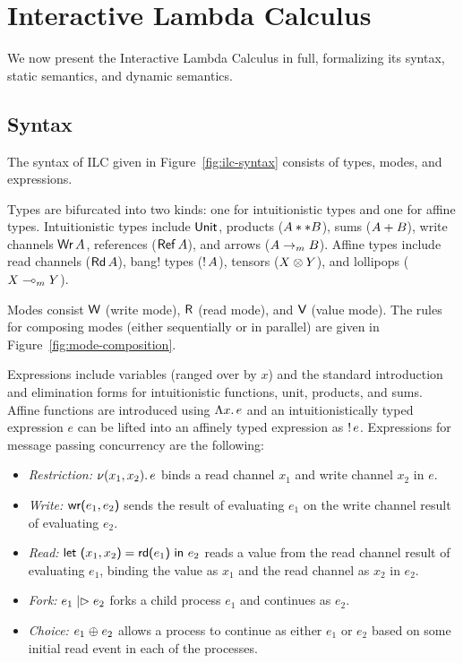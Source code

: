 \section{Interactive Lambda Calculus}
\label{sec:ilc}

We now present the Interactive Lambda Calculus in full, formalizing its syntax,
static semantics, and dynamic semantics.

\subsection{Syntax}
\label{subsec:syntax}



The syntax of ILC given in Figure~\ref{fig:ilc-syntax} consists of types, modes,
and expressions.

Types are bifurcated into two kinds: one for intuitionistic types and one for
affine types. Intuitionistic types include $\text{\textsf{Unit}}$, products
(${A} ** {B}$), sums (${A} + {B}$), write channels $\text{\textsf{Wr}}\,A$, references
($\text{\textsf{Ref}}\,A$), and arrows (${A}\rightarrow_{\footnotesize m}{B}$). Affine types
include read channels ($\text{\textsf{Rd}}\,A$), bang! types (${!}\,{A}$), tensors
(${X}\otimes{Y}$), and lollipops (${X}\multimap_{\footnotesize m}{Y}$).

Modes consist $\textsf{W}$ (write mode), $\textsf{R}$ (read mode), and $\textsf{V}$ (value mode). The
rules for composing modes (either sequentially or in parallel) are given in
Figure~\ref{fig:mode-composition}.

Expressions include variables (ranged over by $x$) and the standard introduction
and elimination forms for intuitionistic functions, unit, products, and
sums.  Affine functions are introduced using
$\Lambda{x}.\,{e}$ and an intuitionistically typed expression $e$ can be lifted into
an affinely typed expression as ${!}\,{e}$. 
Expressions for message passing concurrency are the following:
\begin{itemize}[leftmargin=*]
  \item \emph{Restriction:} $\nu(x_1, x_2).\,e$ binds a read channel $x_1$ and
    write channel $x_2$ in $e$.
  \item \emph{Write:} $\text{\textsf{wr}}\textsf{(}{e_1},{e_2}\textsf{)}$ sends the result of evaluating $e_1$ on
    the write channel result of evaluating $e_2$.
  \item \emph{Read:} $\text{\textsf{let}}\ {\textsf{(}{x_1},{x_2}\textsf{)}} = {\text{\textsf{rd}}\textsf{(}{e_1}\textsf{)}}\ \text{\textsf{in}}\ {{e_2}}$ reads a value from the read
    channel result of evaluating $e_1$, binding the value as $x_1$ and the read
    channel as $x_2$ in $e_2$.
  \item \emph{Fork:} $e_1 \mathrel{|\rhd} e_2$ forks a child process $e_1$ and
    continues as $e_2$.
  \item \emph{Choice:} $e_1 \mathrel{\oplus} e_2$ allows a process to continue as
    either $e_1$ or $e_2$ based on some initial read event in each of the
    processes.
\end{itemize}

